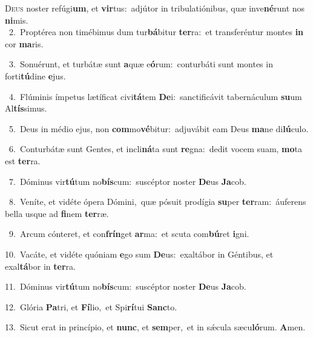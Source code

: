 \lettrine{\initial\textcolor{\initialcolor}{D}}{eus} noster refúgi\-\textbf{um}\-, et \textbf{vir}\-tus:~\star adjútor in tribulatiónibus, quæ inve\-\textbf{né}\-runt nos \textbf{ni}\-mis.\\
{\numbfont\textcolor{\numbcolor}{~2.}}~Proptérea non timébimus dum tur\-\textbf{bá}\-bitur \textbf{ter}\-ra:~\star et transferéntur montes \textbf{in} cor \textbf{ma}\-ris.\par
{\numbfont\textcolor{\numbcolor}{~3.}}~Sonuérunt, et turbátæ sunt \textbf{a}\-quæ e\-\textbf{ó}\-rum:~\star conturbáti sunt montes in forti\-\textbf{tú}\-dine \textbf{e}\-jus.\par
{\numbfont\textcolor{\numbcolor}{~4.}}~Flúminis ímpetus lætíficat civi\-\textbf{tá}\-tem \textbf{De}\-i:~\star sanctificávit tabernáculum \textbf{su}\-um Al\-\textbf{tís}\-simus.\par
{\numbfont\textcolor{\numbcolor}{~5.}}~Deus in médio ejus, non \textbf{com}\-mo\-\textbf{vé}\-bitur:~\star adjuvábit eam Deus \textbf{ma}\-ne di\-\textbf{lú}\-culo.\par
{\numbfont\textcolor{\numbcolor}{~6.}}~Conturbátæ sunt Gentes, et incli\-\textbf{ná}\-ta sunt \textbf{re}\-gna:~\star dedit vocem suam, \textbf{mo}\-ta est \textbf{ter}\-ra.\par
{\numbfont\textcolor{\numbcolor}{~7.}}~Dóminus vir\-\textbf{tú}\-tum no\-\textbf{bís}\-cum:~\star suscéptor noster \textbf{De}\-us \textbf{Ja}\-cob.\par
{\numbfont\textcolor{\numbcolor}{~8.}}~Veníte, et vidéte ópera Dómini,~\dagger quæ pósuit prodígia \textbf{su}\-per \textbf{ter}\-ram:~\star áuferens bella usque ad \textbf{fi}\-nem \textbf{ter}\-ræ.\par
{\numbfont\textcolor{\numbcolor}{~9.}}~Arcum cónteret, et con\-\textbf{frín}\-get \textbf{ar}\-ma:~\star et scuta com\-\textbf{bú}\-ret \textbf{i}\-gni.\par
{\numbfont\textcolor{\numbcolor}{10.}}~Vacáte, et vidéte quóniam \textbf{e}\-go sum \textbf{De}\-us:~\star exaltábor in Géntibus, et exal\-\textbf{tá}\-bor in \textbf{ter}\-ra.\par
{\numbfont\textcolor{\numbcolor}{11.}}~Dóminus vir\-\textbf{tú}\-tum no\-\textbf{bís}\-cum:~\star suscéptor noster \textbf{De}\-us \textbf{Ja}\-cob.\par
{\numbfont\textcolor{\numbcolor}{12.}}~Glória \textbf{Pa}\-tri, et \textbf{Fí}\-lio,~\star et Spi\-\textbf{rí}\-tui \textbf{Sanc}\-to.\par
{\numbfont\textcolor{\numbcolor}{13.}}~Sicut erat in princípio, et \textbf{nunc}\-, et \textbf{sem}\-per,~\star et in sǽcula sæcu\-\textbf{ló}\-rum. \textbf{A}\-men.\par
